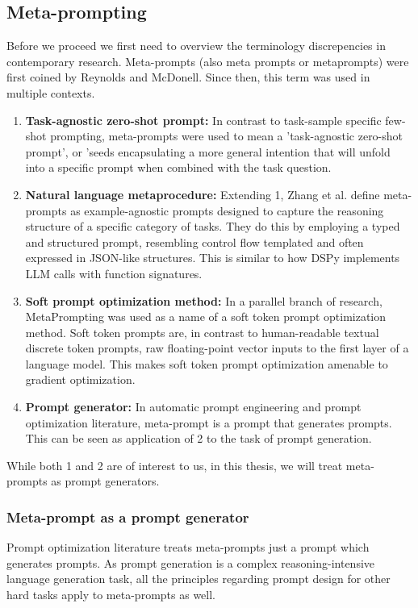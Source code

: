 \subsection{Meta-prompting}
Before we proceed we first need to overview the terminology discrepencies in contemporary research. 
Meta-prompts (also meta prompts or metaprompts) were first coined by Reynolds and McDonell\cite{reynolds2021promptprogramminglargelanguage}. 
Since then, this term was used in multiple contexts.
\begin{enumerate}
    \item \textbf{Task-agnostic zero-shot prompt:} In contrast to task-sample specific few-shot prompting, 
    meta-prompts were used to mean a 'task-agnostic zero-shot prompt', or 'seeds encapsulating a more general intention that will unfold into
    a specific prompt when combined with the task question\cite{reynolds2021promptprogramminglargelanguage}. 
    \item \textbf{Natural language metaprocedure:} Extending 1, Zhang et al.\cite{zhang2025metapromptingaisystems} define meta-prompts as example-agnostic prompts
    designed to capture the reasoning structure of a specific category of tasks. They do this by employing a typed and structured prompt, 
    resembling control flow templated and often expressed in JSON-like structures.
    This is similar to how DSPy\cite{khattab2023dspycompilingdeclarativelanguage} implements LLM calls with function signatures.
    \item \textbf{Soft prompt optimization method:} In a parallel branch of research, MetaPrompting\cite{hou2023metapromptinglearninglearnbetter} 
    was used as a name of a soft token prompt optimization method. Soft token prompts are, in contrast to human-readable textual discrete token prompts, 
    raw floating-point vector inputs to the first layer of a language model. This makes soft token prompt optimization amenable to gradient optimization.
    \item \textbf{Prompt generator:} In automatic prompt engineering and prompt optimization literature, meta-prompt is a prompt that generates prompts\cite{dewynter2024metaprompting}.
    This can be seen as application of 2 to the task of prompt generation\cite{zhang2025metapromptingaisystems}.
\end{enumerate}

While both 1 and 2 are of interest to us, in this thesis, we will treat meta-prompts as prompt generators. 

\subsubsection{Meta-prompt as a prompt generator}
Prompt optimization literature\cite{ramnath2025systematicsurveyautomaticprompt} treats meta-prompts just a prompt which generates prompts.
As prompt generation is a complex reasoning-intensive language generation task\cite{ye2024promptengineeringpromptengineer}, 
all the principles regarding prompt design for other hard tasks apply to meta-prompts as well.

